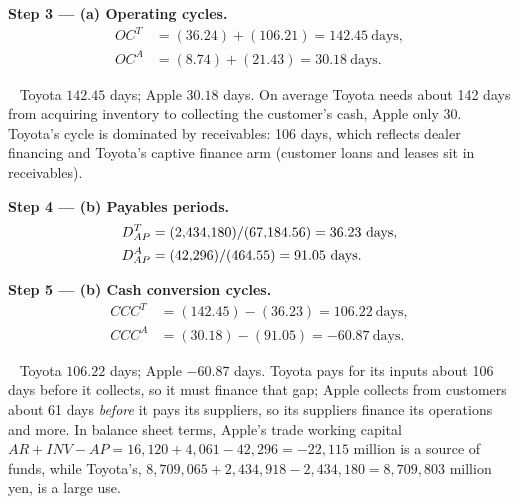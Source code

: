 \documentclass[11pt,a4paper]{article}
\newcommand{\step}[2]{\par\medskip\noindent\textbf{Step #1 --- #2.}~}
\newcommand{\answer}[1]{\par\smallskip\noindent\fbox{\textbf{Answer #1.}}~}
\begin{document}
\step{3}{(a) Operating cycles}
\begin{align}
  OC^{T} &= (36.24) + (106.21) = 142.45 \ \text{days}, \label{r5be8-oct}\\
  OC^{A} &= (8.74) + (21.43) = 30.18 \ \text{days}. \label{r5be8-oca}
\end{align}

\answer{(a)} Toyota $142.45$ days; Apple $30.18$ days. On average Toyota needs about 142 days from
acquiring inventory to collecting the customer's cash, Apple only 30. Toyota's cycle is dominated
by receivables: 106 days, which reflects dealer financing and Toyota's captive finance arm
(customer loans and leases sit in receivables).

\step{4}{(b) Payables periods}
\begin{align}
  D_{AP}^{T} &= (2{,}434{,}180)/(67{,}184.56) = 36.23 \ \text{days}, \notag\\
  D_{AP}^{A} &= (42{,}296)/(464.55) = 91.05 \ \text{days}. \notag
\end{align}

\step{5}{(b) Cash conversion cycles}
\begin{align}
  CCC^{T} &= (142.45) - (36.23) = 106.22 \ \text{days}, \label{r5be8-ccct}\\
  CCC^{A} &= (30.18) - (91.05) = -60.87 \ \text{days}. \label{r5be8-ccca}
\end{align}

\answer{(b)} Toyota $106.22$ days; Apple $-60.87$ days. Toyota pays for its inputs about 106 days
before it collects, so it must finance that gap; Apple collects from customers about 61 days
\emph{before} it pays its suppliers, so its suppliers finance its operations and more. In balance
sheet terms, Apple's trade working capital $AR + INV - AP = 16{,}120 + 4{,}061 - 42{,}296 =
-22{,}115$ million is a source of funds, while Toyota's, $8{,}709{,}065 + 2{,}434{,}918 -
2{,}434{,}180 = 8{,}709{,}803$ million yen, is a large use.
\end{document}
